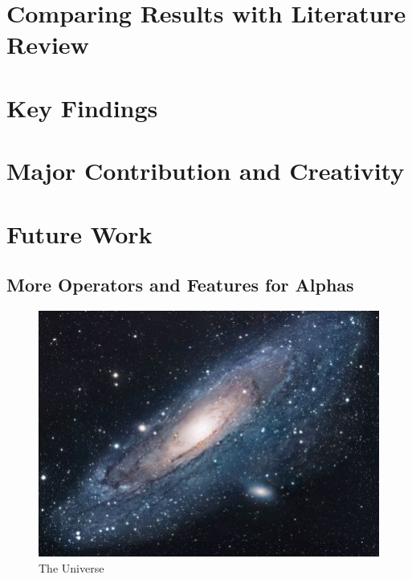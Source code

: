 \documentclass[a4paper,12pt]{report}
\numberwithin{equation}{section}
\theoremstyle{definition}
\begin{document}
\section{Comparing Results with Literature Review}
\section{Key Findings}
\section{Major Contribution and Creativity}
\section{Future Work}
\subsection{More Operators and Features for Alphas}


\begin{figure}[h!]
\centering
\includegraphics[scale=1.7]{universe}
\caption{The Universe}
\label{fig:universe}
\end{figure}





\end{document}
